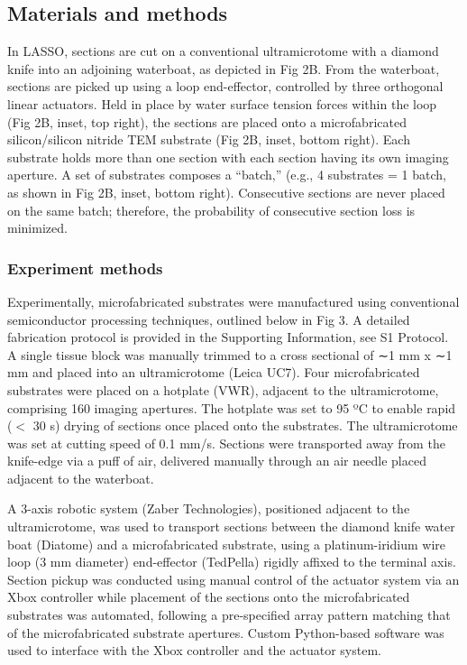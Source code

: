 \documentclass{article}
\begin{document}
\subsection*{Materials and methods}

In LASSO, sections are cut on a conventional ultramicrotome with a diamond knife into an adjoining waterboat, as depicted in Fig 2B. From the waterboat, sections are picked up using a loop end-effector, controlled by three orthogonal linear actuators. Held in place by water surface tension forces within the loop (Fig 2B, inset, top right), the sections are placed onto a microfabricated silicon/silicon nitride TEM substrate (Fig 2B, inset, bottom right). Each substrate holds more than one section with each section having its own imaging aperture. A set of substrates composes a “batch,” (e.g., 4 substrates = 1 batch, as shown in Fig 2B, inset, bottom right). Consecutive sections are never placed on the same batch; therefore, the probability of consecutive section loss is minimized.

\subsubsection*{Experiment methods}

Experimentally, microfabricated substrates were manufactured using conventional semiconductor processing techniques, outlined below in Fig 3. A detailed fabrication protocol is provided in the Supporting Information, see S1 Protocol. A single tissue block was manually trimmed to a cross sectional of ∼1 mm x ∼1 mm and placed into an ultramicrotome (Leica UC7). Four microfabricated substrates were placed on a hotplate (VWR), adjacent to the ultramicrotome, comprising 160 imaging apertures. The hotplate was set to 95 ºC to enable rapid ($<$ 30 s) drying of sections once placed onto the substrates. The ultramicrotome was set at cutting speed of 0.1 mm/s. Sections were transported away from the knife-edge via a puff of air, delivered manually through an air needle placed adjacent to the waterboat.

A 3-axis robotic system (Zaber Technologies), positioned adjacent to the ultramicrotome, was used to transport sections between the diamond knife water boat (Diatome) and a microfabricated substrate, using a platinum-iridium wire loop (3 mm diameter) end-effector (TedPella) rigidly affixed to the terminal axis. Section pickup was conducted using manual control of the actuator system via an Xbox controller while placement of the sections onto the microfabricated substrates was automated, following a pre-specified array pattern matching that of the microfabricated substrate apertures. Custom Python-based software was used to interface with the Xbox controller and the actuator system.
\end{document}
